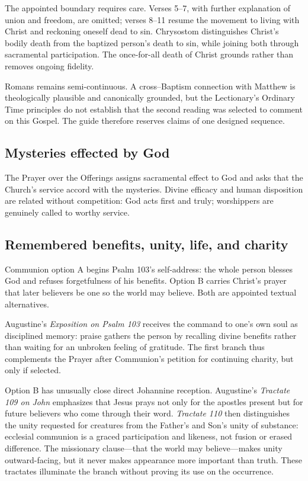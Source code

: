 \begin{deepstudy}
The appointed boundary requires care. Verses 5--7, with further explanation of union and freedom, are omitted; verses 8--11 resume the movement to living with Christ and reckoning oneself dead to sin. Chrysostom distinguishes Christ's bodily death from the baptized person's death to sin, while joining both through sacramental participation. The once-for-all death of Christ grounds rather than removes ongoing fidelity.

Romans remains semi-continuous. A cross--Baptism connection with Matthew is theologically plausible and canonically grounded, but the Lectionary's Ordinary Time principles do not establish that the second reading was selected to comment on this Gospel. The guide therefore reserves claims of one designed sequence.

\subsection*{Mysteries effected by God\enspace{}}

The Prayer over the Offerings assigns sacramental effect to God and asks that the Church's service accord with the mysteries. Divine efficacy and human disposition are related without competition: God acts first and truly; worshippers are genuinely called to worthy service.

\subsection*{Remembered benefits, unity, life, and charity\enspace{}}

Communion option A begins Psalm 103's self-address: the whole person blesses God and refuses forgetfulness of his benefits. Option B carries Christ's prayer that later believers be one so the world may believe. Both are appointed textual alternatives.

Augustine's \emph{Exposition on Psalm 103} receives the command to one's own soul as disciplined memory: praise gathers the person by recalling divine benefits rather than waiting for an unbroken feeling of gratitude. The first branch thus complements the Prayer after Communion's petition for continuing charity, but only if selected.

Option B has unusually close direct Johannine reception. Augustine's \emph{Tractate 109 on John} emphasizes that Jesus prays not only for the apostles present but for future believers who come through their word. \emph{Tractate 110} then distinguishes the unity requested for creatures from the Father's and Son's unity of substance: ecclesial communion is a graced participation and likeness, not fusion or erased difference. The missionary clause---that the world may believe---makes unity outward-facing, but it never makes appearance more important than truth. These tractates illuminate the branch without proving its use on the occurrence.


\end{deepstudy}
